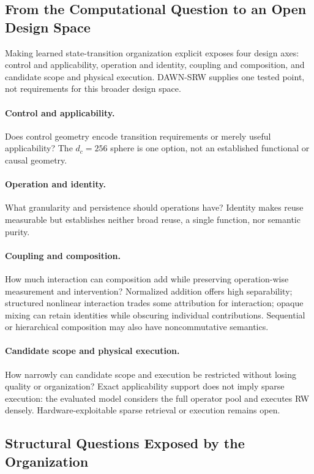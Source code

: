 \documentclass{article}
\newcommand{\DAWN}{DAWN-SRW}
\begin{document}
\subsection{From the Computational Question to an Open Design Space}

Making learned state-transition organization explicit exposes four design axes:
control and applicability, operation and identity, coupling and composition, and
candidate scope and physical execution. \DAWN{} supplies one tested point, not
requirements for this broader design space.

\paragraph{Control and applicability.}
Does control geometry encode transition requirements or merely useful
applicability? The \(d_c=256\) sphere is one option, not an established functional
or causal geometry.

\paragraph{Operation and identity.}
What granularity and persistence should operations have? Identity makes reuse
measurable but establishes neither broad reuse, a single function, nor semantic
purity.

\paragraph{Coupling and composition.}
How much interaction can composition add while preserving operation-wise
measurement and intervention? Normalized addition offers high separability;
structured nonlinear interaction trades some attribution for interaction; opaque
mixing can retain identities while obscuring individual contributions. Sequential
or hierarchical composition may also have noncommutative semantics.

\paragraph{Candidate scope and physical execution.}
How narrowly can candidate scope and execution be restricted without losing
quality or organization? Exact applicability support does not imply sparse
execution: the evaluated model considers the full operator pool and executes RW
densely. Hardware-exploitable sparse retrieval or execution remains open.

\subsection{Structural Questions Exposed by the Organization}
\end{document}
